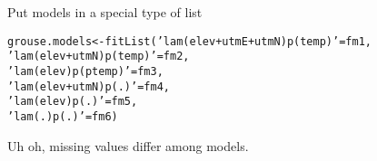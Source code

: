 \documentclass[color=usenames,dvipsnames]{beamer}\usepackage[]{graphicx}\usepackage[]{color}
\makeatletter
\newcommand{\hlstr}[1]{\textcolor[rgb]{0.749,0.012,0.012}{#1}}%
\newcommand{\hlstd}[1]{\textcolor[rgb]{0,0,0}{#1}}%
\newcommand{\hlkwb}[1]{\textcolor[rgb]{0,0.341,0.682}{#1}}%
\newcommand{\hlkwd}[1]{\textcolor[rgb]{0.004,0.004,0.506}{#1}}%
\newenvironment{kframe}{%
 \def\at@end@of@kframe{}%
 \ifinner\ifhmode%
  \def\at@end@of@kframe{\end{minipage}}%
  \begin{minipage}{\columnwidth}%
 \fi\fi%
 \def\FrameCommand##1{\hskip\@totalleftmargin \hskip-\fboxsep
 \colorbox{shadecolor}{##1}\hskip-\fboxsep
     \hskip-\linewidth \hskip-\@totalleftmargin \hskip\columnwidth}%
 \MakeFramed {\advance\hsize-\width
   \@totalleftmargin\z@ \linewidth\hsize
   \@setminipage}}%
 {\par\unskip\endMakeFramed%
 \at@end@of@kframe}
\newenvironment{knitrout}{}{} %
\makeatother
\begin{document}
\begin{frame}[fragile]
\begin{knitrout}
\begin{kframe}
{\ttfamily\noindent\bfseries{}}\end{kframe}
\end{knitrout}
\pause
\vfill
Put models in a special type of list
  \vspace{-6pt}
\begin{knitrout}\footnotesize
{}\color{fgcolor}\begin{kframe}
\begin{alltt}
\hlstd{grouse.models} \hlkwb{<-} \hlkwd{fitList}\hlstd{(}\hlstr{'lam(elev+utmE+utmN)p(temp)'}\hlstd{=fm1,}
                         \hlstr{'lam(elev+utmN)p(temp)'}\hlstd{=fm2,}
                         \hlstr{'lam(elev)p(ptemp)'}\hlstd{=fm3,}
                         \hlstr{'lam(elev+utmN)p(.)'}\hlstd{=fm4,}
                         \hlstr{'lam(elev)p(.)'}\hlstd{=fm5,}
                         \hlstr{'lam(.)p(.)'}\hlstd{=fm6)}
\end{alltt}


{\ttfamily\noindent\bfseries\color{errorcolor}{\#\# Error in validityMethod(object): Data are not the same among models due to missing covariate values. Consider removing NAs before analysis.}}\end{kframe}
\end{knitrout}
\pause
Uh oh, missing values differ among models.
\end{frame}
\end{document}
